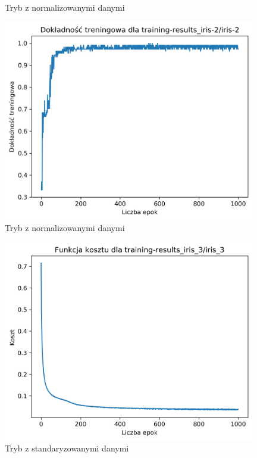 \documentclass{classrep}
\begin{document}
{{{\begin{figure}[!htbp]
                    \caption{Tryb z normalizowanymi danymi}
                \end{figure}
                \begin{figure}[!htbp]
                    \centering
                    \includegraphics[width=110mm]{wykresy/iris-2_training-accuracy.png}
                    \caption{Tryb z normalizowanymi danymi}
                \end{figure}
                \FloatBarrier
                \begin{figure}[!htbp]
                    \centering
                    \includegraphics[width=110mm]{wykresy/iris_3_cost.png}
                    \caption{Tryb z standaryzowanymi danymi}
                \end{figure}
                \begin{figure}[!htbp]

\end{figure}}}}
\end{document}
